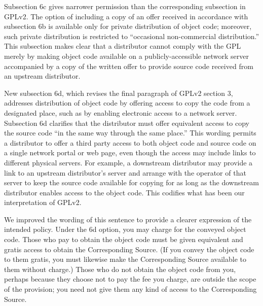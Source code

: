 
Subsection 6c gives narrower permission than the corresponding subsection in
GPLv2.  The option of including a copy of an offer received in accordance
with subsection 6b is available only for private distribution of object code;
moreover, such private distribution is restricted to ``occasional
non-commercial distribution.''  This subsection makes clear that a
distributor cannot comply with the GPL merely by making object code available
on a publicly-accessible network server accompanied by a copy of the written
offer to provide source code received from an upstream distributor.


New subsection 6d, which revises the final paragraph of GPLv2 section 3,
addresses distribution of object code by offering access to copy the code
from a designated place, such as by enabling electronic access to a network
server.  Subsection 6d clarifies that the distributor must offer equivalent
access to copy the source code ``in the same way through the same place.''
This wording permits a distributor to offer a third party access to both
object code and source code on a single network portal or web page, even
though the access may include links to different physical servers.  For
example, a downstream distributor may provide a link to an upstream
distributor's server and arrange with the operator of that server to keep the
source code available for copying for as long as the downstream distributor
enables access to the object code.  This codifies what has been our
interpretation of GPLv2.


We improved the wording of this sentence to provide a clearer expression of
the intended policy.  Under the 6d option, you may charge for the conveyed
object code. Those who pay to obtain the object code must be given equivalent
and gratis access to obtain the Corresponding Source.  (If you convey the
object code to them gratis, you must likewise make the Corresponding Source
available to them without charge.) Those who do not obtain the object code
from you, perhaps because they choose not to pay the fee you charge, are
outside the scope of the provision; you need not give them any kind of access
to the Corresponding Source.


